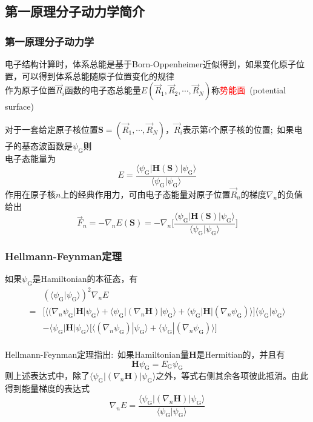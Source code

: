 \subsection{第一原理分子动力学简介}
\frame
{
	\frametitle{第一原理分子动力学}
	电子结构计算时，体系总能是基于\textrm{Born-Oppenheimer}近似得到，如果变化原子位置，可以得到体系总能随原子位置变化的规律\\
	作为原子位置$\vec R_i$函数的电子态总能量$E(\vec R_1,\vec R_2,\cdots,\vec R_N)$称\textcolor{red}{势能面}~(\textrm{potential surface})

	对于一套给定原子核位置$\mathbf{S}=(\vec R_1,\cdots,\vec R_N)$，$\vec R_i$表示第$i$个原子核的位置;~如果电子的基态波函数是$\psi_{\mathrm{G}}$则\\电子态能量为
	\begin{displaymath}
		E=\dfrac{\langle\psi_{\mathrm{G}}|\mathbf{H}(\mathbf{S})|\psi_{\mathrm{G}}\rangle}{\langle\psi_{\mathrm{G}}|\psi_{\mathrm{G}}\rangle}
	\end{displaymath}
作用在原子核$n$上的经典作用力，可由电子态能量对原子位置$\vec R_n$的梯度$\nabla_n$的负值给出
\begin{displaymath}
	\vec F_n=-\nabla_nE(\mathbf{S})=-\nabla_n\bigg[\dfrac{\langle\psi_{\mathrm{G}}|\mathbf{H}(\mathbf{S})|\psi_{\mathrm{G}}\rangle}{\langle\psi_{\mathrm{G}}|\psi_{\mathrm{G}}\rangle}\bigg]
\end{displaymath}
}

\frame
{
	\frametitle{\textrm{Hellmann-Feynman}定理}
	如果$\psi_{\mathrm{G}}$是\textrm{Hamiltonian}的本征态，有
	\begin{displaymath}
		\begin{aligned}
			&(\langle\psi_{\mathrm{G}}|\psi_{\mathrm{G}}\rangle)^2\nabla_nE\\
			=&\big[\langle(\nabla_n\psi_{\mathrm{G}}|\mathbf{H}|\psi_{\mathrm{G}}\rangle+\langle\psi_{\mathrm{G}}|(\nabla_n\mathbf{H})|\psi_{\mathrm{G}}\rangle+\langle\psi_{\mathrm{G}}|\mathbf{H}|(\nabla_n\psi_{\mathrm{G}})\rangle\big]\langle\psi_{\mathrm{G}}|\psi_{\mathrm{G}}\rangle\\
			&-\langle\psi_{\mathrm{G}}|\mathbf{H}|\psi_{\mathrm{G}}\rangle\big[\langle(\nabla_n\psi_{\mathrm{G}})|\psi_{\mathrm{G}}\rangle+\langle\psi_{\mathrm{G}}|(\nabla_n\psi_{\mathrm{G}})\rangle\big]
		\end{aligned}
	\end{displaymath}
	{\fontsize{6.2pt}{5.2pt}}\\
	\vskip 5pt
	\textrm{Hellmann-Feynman}定理指出:~如果\textrm{Hamiltonian}量$\mathbf{H}$是\textrm{Hermitian}的，并且有
	\begin{displaymath}
		\mathbf{H}\psi_{\mathrm{G}}=E_{\mathrm{G}}\psi_{\mathrm{G}}
	\end{displaymath}
则上述表达式中，除了$\langle\psi_{\mathrm{G}}|(\nabla_n\mathbf{H})|\psi_{\mathrm{G}}\rangle$之外，等式右侧其余各项彼此抵消。由此得到能量梯度的表达式
\begin{displaymath}
	\nabla_nE=\dfrac{\langle\psi_{\mathrm{G}}|(\nabla_n\mathbf{H})|\psi_{\mathrm{G}}\rangle}{\langle\psi_{\mathrm{G}}|\psi_{\mathrm{G}}\rangle}
\end{displaymath}
}

